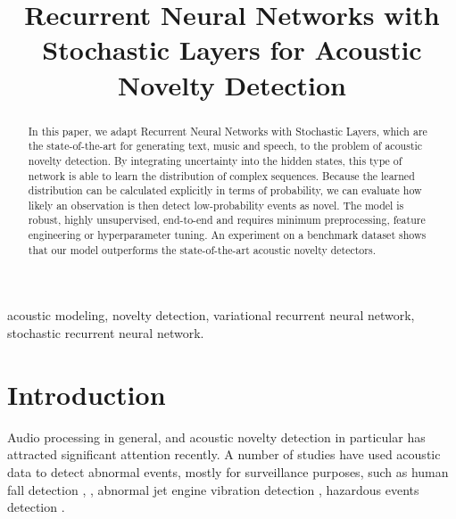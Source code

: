 \documentclass{article}
\begin{document}
\title{Recurrent Neural Networks with Stochastic Layers for Acoustic Novelty Detection}

\address{ IMT Atlantique, Lab-STICC, UBL, Brest, France\\
(2) Institute for Big Data Analytics, Dalhousie University, Halifax, Canada \\
(3) Institute of Computer Science, Polish Academy of Sciences, Warsaw, Poland}

\maketitle

\begin{abstract}

In  this paper, we adapt Recurrent Neural Networks with Stochastic Layers, which are the state-of-the-art for generating text, music and speech, to the problem of acoustic novelty detection. By integrating uncertainty into the hidden states, this type of network is able to learn the distribution of complex sequences. Because the learned distribution can be calculated explicitly in terms of probability, we can evaluate how likely an observation is then detect low-probability events as novel.
The model is robust, highly unsupervised, end-to-end and requires minimum preprocessing, feature engineering or hyperparameter tuning. An experiment on a benchmark dataset shows that our model outperforms the state-of-the-art acoustic novelty detectors. 


\end{abstract}
\begin{keywords}
acoustic modeling, novelty detection, variational recurrent neural network, stochastic recurrent neural network.
\end{keywords}
 \section{Introduction}
\label{secIntroduction}
 Audio processing in general, and acoustic novelty detection in particular has attracted significant attention recently. A number of studies have used acoustic data to detect abnormal events, mostly for surveillance purposes, such as human fall detection \cite{zhuang_acoustic_2009}, \cite{salman_khan_unsupervised_2015}, abnormal jet engine vibration detection \cite{clifton_novelty_2015}, hazardous events detection \cite{ntalampiras_probabilistic_2011}.
 
\end{document}
